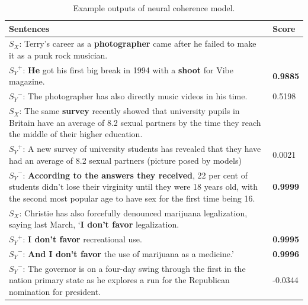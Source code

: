 \documentclass[letterpaper]{article} %
\begin{document}
      \begin{table}[ht]
		\centering
		\caption{Example outputs of neural coherence model.}
		\label{tab:coherence_examples}

		\begin{tabular}{|p{65mm}|p{11mm}|}
			\hline
			 \centering Sentences &  Score \\\hline
			$S_X$: \small{Terry's career as a \textbf{photographer} came after he failed to make it as a punk rock musician.} & \\
			${S_Y}^{+}$: \small{\textbf{He} got his first big break in 1994 with a \textbf{shoot} for Vibe magazine.} & \textbf{0.9885} \\
			${S_Y}^{-}$: \small{The photographer has also directly music videos in his time.} & 0.5198 \\
			\hline
			$S_X$: \small{The same \textbf{survey} recently showed that university pupils in Britain have an average of 8.2 sexual partners by the time they reach the middle of their higher education.} & \\
			${S_Y}^{+}$: \small{A new survey of university students has revealed that they have had an average of 8.2 sexual partners (picture posed by models)} & 0.0021 \\
			${S_Y}^{-}$: \small{\textbf{According to the answers they received}, 22 per cent of students didn't lose their virginity until they were 18 years old, with the second most popular age to have sex for the first time being 16. } & \textbf{0.9999} \\
			\hline
			$S_X$: \small{Christie has also forcefully denounced marijuana legalization, saying last March, `\textbf{I don't favor} legalization.} & \\
			${S_Y}^{+}$: \small{\textbf{I don't favor} recreational use.} &\textbf{0.9995} \\
			${S_Y}^{-}$: \small{\textbf{And I don't favor} the use of marijuana as a medicine.'} & \textbf{0.9996} \\
			${S_Y}^{-}$: \small{The governor is on a four-day swing through the first in the nation primary state as he explores a run for the Republican nomination for president.} & -0.0344 \\
			\hline
		\end{tabular}
	\end{table}
\end{document}
